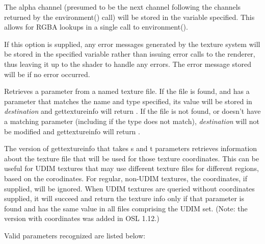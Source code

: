 \documentclass[11pt,letterpaper]{book}
\begin{document}
\vspace{12pt}
The alpha channel (presumed to be the next channel following the
channels returned by the {\cf environment()} call) will be stored in the
variable specified.  This allows for RGBA lookups in a single call to
{\cf environment()}.
\apiend
\vspace{-16pt}

\vspace{12pt}
If this option is supplied, any error messages generated by the texture
system will be stored in the specified variable rather than issuing error
calls to the renderer, thus leaving it up to the shader to handle any
errors. The error message stored will be \qkw{} if no error occurred.
\apiend
\vspace{-16pt}

\apiend


\newpage
{}

Retrieves a parameter from a named texture file.  If the file is found,
and has a parameter that matches the name and type specified, its value
will be stored in \emph{destination} and {\cf gettextureinfo} will
return {}.  If the file is not found, or doesn't have a matching
parameter (including if the type does not match), \emph{destination}
will not be modified and {\cf gettextureinfo} will return {}.

The version of {\cf gettextureinfo} that takes {\cf s} and {\cf t} parameters
retrieves information about the texture file that will be used for those
texture coordinates. This can be useful for UDIM textures that may use
different texture files for different regions, based on the corodinates. For
regular, non-UDIM textures, the coordinates, if supplied, will be ignored.
When UDIM textures are queried without coordinates supplied, it will succeed
and return the texture info only if that parameter is found and has the same
value in all files comprising the UDIM set. (Note: the version with
coordinates was added in OSL 1.12.)

Valid parameters recognized are listed below:
\end{document}
